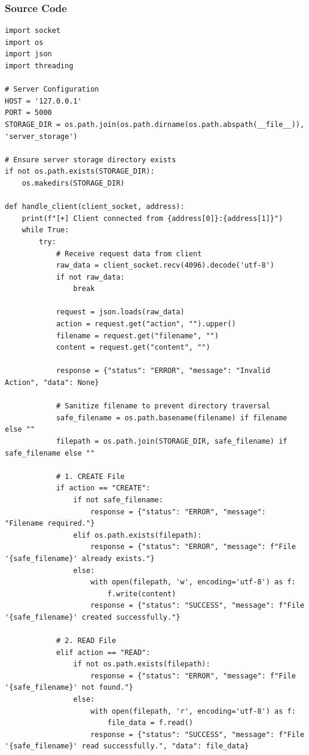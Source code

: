 \documentclass[main]{subfiles}
\begin{document}
\subsubsection*{Source Code}
\begin{verbatim}
import socket
import os
import json
import threading

# Server Configuration
HOST = '127.0.0.1'
PORT = 5000
STORAGE_DIR = os.path.join(os.path.dirname(os.path.abspath(__file__)), 'server_storage')

# Ensure server storage directory exists
if not os.path.exists(STORAGE_DIR):
    os.makedirs(STORAGE_DIR)

def handle_client(client_socket, address):
    print(f"[+] Client connected from {address[0]}:{address[1]}")
    while True:
        try:
            # Receive request data from client
            raw_data = client_socket.recv(4096).decode('utf-8')
            if not raw_data:
                break

            request = json.loads(raw_data)
            action = request.get("action", "").upper()
            filename = request.get("filename", "")
            content = request.get("content", "")

            response = {"status": "ERROR", "message": "Invalid Action", "data": None}

            # Sanitize filename to prevent directory traversal
            safe_filename = os.path.basename(filename) if filename else ""
            filepath = os.path.join(STORAGE_DIR, safe_filename) if safe_filename else ""

            # 1. CREATE File
            if action == "CREATE":
                if not safe_filename:
                    response = {"status": "ERROR", "message": "Filename required."}
                elif os.path.exists(filepath):
                    response = {"status": "ERROR", "message": f"File '{safe_filename}' already exists."}
                else:
                    with open(filepath, 'w', encoding='utf-8') as f:
                        f.write(content)
                    response = {"status": "SUCCESS", "message": f"File '{safe_filename}' created successfully."}

            # 2. READ File
            elif action == "READ":
                if not os.path.exists(filepath):
                    response = {"status": "ERROR", "message": f"File '{safe_filename}' not found."}
                else:
                    with open(filepath, 'r', encoding='utf-8') as f:
                        file_data = f.read()
                    response = {"status": "SUCCESS", "message": f"File '{safe_filename}' read successfully.", "data": file_data}


\end{verbatim}
\end{document}
